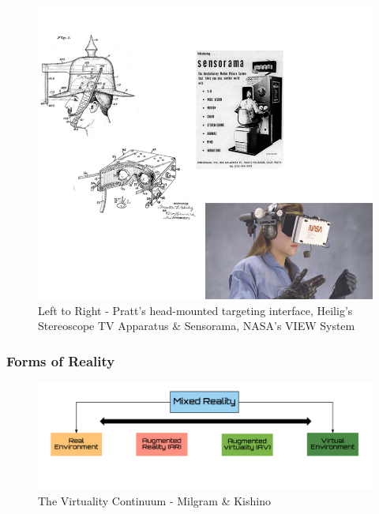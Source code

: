 \begin{frame}
	\begin{figure}
		\includegraphics[scale=.6]{assets/history.png}
		\caption{\tiny{Left to Right - Pratt's head-mounted targeting interface, Heilig's Stereoscope TV Apparatus \& Sensorama, NASA's VIEW System} }
	\end{figure}
\end{frame}

\begin{frame}
	\frametitle{Forms of Reality}
	\begin{figure}
		\includegraphics[scale=.2]{assets/continuum.png}
		\caption{The Virtuality Continuum - Milgram \& Kishino}
	\end{figure}
\end{frame}


